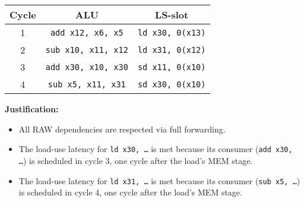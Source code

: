 \documentclass[12pt]{article}
\begin{document}
\begin{table}[h!]
    \centering
    \begin{tabular}{|c|c|c|}
    \hline
    \textbf{Cycle} & \textbf{ALU}                    & \textbf{LS-slot}                  \\ \hline
    1              & \texttt{add x12, x6, x5}            & \texttt{ld x30, 0(x13)}           \\ \hline
    2              & \texttt{sub x10, x11, x12}          & \texttt{ld x31, 0(x12)}           \\ \hline
    3              & \texttt{add x30, x10, x30}          & \texttt{sd x11, 0(x10)}           \\ \hline
    4              & \texttt{sub x5, x11, x31}           & \texttt{sd x30, 0(x10)}           \\ \hline
    \end{tabular}
\end{table}

\textbf{Justification:}
\begin{itemize}
  \item All RAW dependencies are respected via full forwarding.
  \item The load-use latency for \texttt{ld x30, \dots} is met because its consumer (\texttt{add x30, \dots}) is scheduled in cycle 3, one cycle after the load's MEM stage.
  \item The load-use latency for \texttt{ld x31, \dots} is met because its consumer (\texttt{sub x5, \dots}) is scheduled in cycle 4, one cycle after the load's MEM stage.
\end{itemize}
\end{document}
